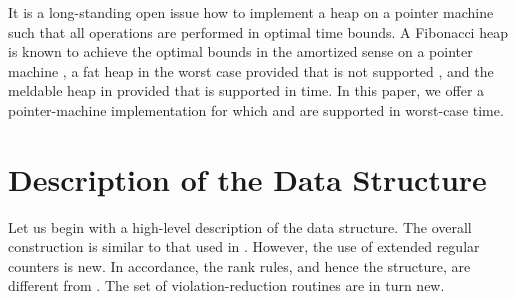 \documentclass{llncs}
\newcommand{\Decrease}{\mbox{}}
\newcommand{\Meld}{\mbox{}}
\begin{document}
It is a long-standing open issue how to implement a heap on a
pointer machine such that
all operations are performed in optimal time bounds.
A Fibonacci heap is known to achieve the optimal bounds in the
amortized sense on a pointer machine \cite{KT08}, a fat heap in 
the worst case provided that \Meld{} is not supported \cite{KT99},
and the meldable heap in \cite{Bro95} provided that \Decrease{} is supported in  time.  
In this paper, we offer a pointer-machine implementation for which 
\Decrease{} and \Meld{} are supported in  worst-case time.

\section{Description of the Data Structure}

Let us begin with a high-level description of the data structure.
The overall construction is similar to that used in
\cite{Bro96}.  However, the use of extended regular counters is new.
In accordance, the rank rules, and hence the structure, are different from \cite{Bro96}.
The set of violation-reduction routines are in turn new.
\end{document}
